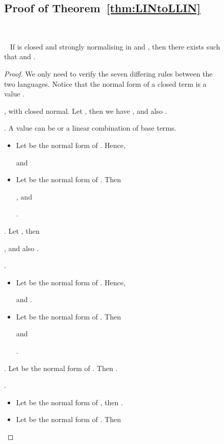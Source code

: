 \documentclass{LMCS}
\makeatletter
\newcommand{\recap}[2]{\medskip\noindent{\bf #1 \ref{#2}.}~}
\def\mynobreakpar{\par\nobreak\@afterheading}
\makeatother
\begin{document}
\begin{figure}
{\subsection{Proof of Theorem~\ref{thm:LINtoLLIN}}\label{proof:LINtoLLIN}~
\mynobreakpar
\recap{Theorem}{thm:LINtoLLIN}
If  is closed and strongly normalising in  and  , then there exists  such that  and .\mynobreakpar
\begin{proof}
  We only need to verify the seven differing rules between the two languages.
  Notice that the normal form of a closed term is a value .
  \begin{myenumerate}
    \item , with  closed normal. 
      Let , then we have
      ,
      and also
      .
    \item . A value  can be  or a linear combination of base terms.
      \begin{itemize}
	\item Let  be the normal form of . Hence,
	  
	  and
	  
	\item Let  be the normal form of . Then
	  
	   
	   
	   
	   
	  ,
	  and
	  
	   
	   .
      \end{itemize}

    \item . Let , then 
      
      ,
      and also
      .

    \item .  
      \begin{itemize}
	\item Let  be the normal form of . Hence,
	  
	  and
	  .
	\item Let  be the normal form of . Then 
	  
	  
	  
	  
	  and
	  
	  
	  
	  .
      \end{itemize}

    \item . Let  be the normal form of . Then
      .

    \item .
      \begin{itemize}
	\item Let  be the normal form of , then
	  .
	\item Let  be the normal form of . Then
	  

\end{itemize}
\end{myenumerate}
\end{proof}}
\end{figure}
\end{document}
